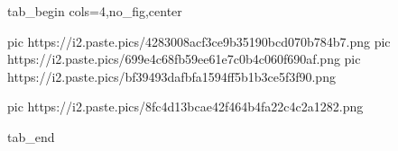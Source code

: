  
 
 
 
 


\ifcmt
  tab_begin cols=4,no_fig,center

     pic https://i2.paste.pics/4283008acf3ce9b35190bcd070b784b7.png
		 pic https://i2.paste.pics/699e4c68fb59ee61e7c0b4c060f690af.png
		 pic https://i2.paste.pics/bf39493dafbfa1594ff5b1b3ce5f3f90.png

		 pic https://i2.paste.pics/8fc4d13bcae42f464b4fa22c4c2a1282.png

  tab_end
\fi

